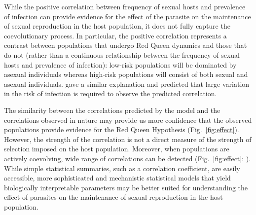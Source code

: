 \documentclass{article}\usepackage[]{graphicx}\usepackage[]{color}
\newcommand{\fref}[1]{Fig.~\ref{fig:#1}}
\begin{document}
While the positive correlation between frequency of sexual hosts and prevalence of infection can provide evidence for the effect of the parasite on the maintenance of sexual reproduction in the host population, it does not fully capture the coevolutionary process.
In particular, the positive correlation represents a contrast between populations that undergo Red Queen dynamics and those that do not (rather than a continuous relationship between the frequency of sexual hosts and prevalence of infection):
low-risk populations will be dominated by asexual individuals whereas high-risk populations will consist of both sexual and asexual individuals.
\cite{lively2001trematode} gave a similar explanation and predicted that large variation in the risk of infection is required to observe the predicted correlation.

The similarity between the correlations predicted by the model and the correlations observed in nature may provide us more confidence that the observed populations provide evidence for the Red Queen Hypothesis (\fref{effect}).
However, the strength of the correlation is not a direct measure of the strength of selection imposed on the host population.
Moreover, when populations are actively coevolving, wide range of correlations can be detected (\fref{effect}: \cite{vergara2014infection}).
While simple statistical summaries, such as a correlation coefficient, are easily accessible,
more sophisticated and mechanistic statistical models that yield biologically interpretable parameters may be better suited for understanding the effect of parasites on the maintenance of sexual reproduction in the host population.
\end{document}
